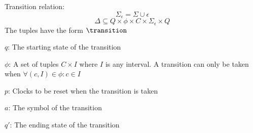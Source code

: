 
\begin{definition}\label{definition:transition}
    \cite*{Eugene2001}
    Transition relation:
    $$\Sigma_\epsilon=\Sigma\cup{\epsilon}$$
    $$\Delta\subseteq Q\times\phi\times C\times\Sigma_\epsilon\times Q$$
    The tuples have the form $\transition$

    $q$: The starting state of the transition

    $\phi$: A set of tuples $C\times I$ where $I$ is any interval.
    A transition can only be taken when $\forall (c,I)\in\phi: c\in I$

    $p$: Clocks to be reset when the transition is taken

    $a$: The symbol of the transition

    $q'$: The ending state of the transition
\end{definition}